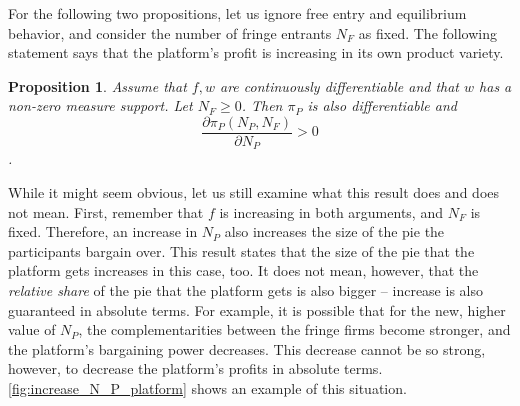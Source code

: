 \documentclass[a4paper]{article}
\newtheorem{proposition}{Proposition}
\begin{document}
For the following two propositions, let us ignore free entry and equilibrium behavior, and consider the number of fringe entrants $N_F$ as fixed.
The following statement says that the platform's profit is increasing in its own product variety.
\begin{proposition}
    \label{prop:share_of_platform}
    Assume that $f, w$ are continuously differentiable and that $w$ has a non-zero measure support.
    Let $N_F \geq 0$.
    Then $\pi_P$ is also differentiable and
    $$\frac{\partial \pi_P(N_P, N_F)}{\partial N_P} > 0$$.
\end{proposition}
While it might seem obvious, let us still examine what this result does and does not mean.
First, remember that $f$ is increasing in both arguments, and $N_F$ is fixed.
Therefore, an increase in $N_P$ also increases the size of the pie the participants bargain over.
This result states that the size of the pie that the platform gets increases in this case, too.
It does not mean, however, that the \emph{relative share} of the pie that the platform gets is also bigger -- increase is also guaranteed in absolute terms.
For example, it is possible that for the new, higher value of $N_P$, the complementarities between the fringe firms become stronger, and the platform's bargaining power decreases.
This decrease cannot be so strong, however, to decrease the platform's profits in absolute terms.
\cref{fig:increase_N_P_platform} shows an example of this situation.
\end{document}
